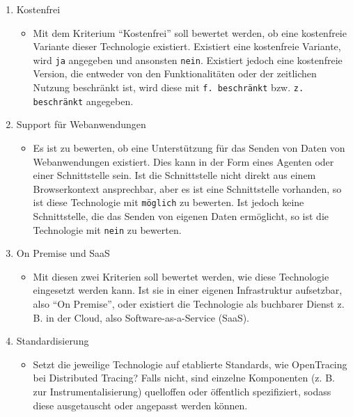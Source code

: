 \begin{enumerate}
	\item Kostenfrei
	\begin{itemize}
		\item Mit dem Kriterium \enquote{Kostenfrei} soll bewertet werden, ob eine kostenfreie Variante dieser Technologie existiert. Existiert eine kostenfreie Variante, wird \texttt{ja} angegeben und ansonsten \texttt{nein}. Existiert jedoch eine kostenfreie Version, die entweder von den Funktionalitäten oder der zeitlichen Nutzung beschränkt ist, wird diese mit \texttt{f. beschränkt} bzw. \texttt{z. beschränkt} angegeben.
	\end{itemize}

	\item Support für Webanwendungen
	\begin{itemize}
		\item Es ist zu bewerten, ob eine Unterstützung für das Senden von Daten von Webanwendungen existiert. Dies kann in der Form eines Agenten\footnotemark{} oder einer Schnittstelle sein. Ist die Schnittstelle nicht direkt aus einem Browserkontext ansprechbar, aber es ist eine Schnittstelle vorhanden, so ist diese Technologie mit \texttt{möglich} zu bewerten. Ist jedoch keine Schnittstelle, die das Senden von eigenen Daten ermöglicht, so ist die Technologie mit \texttt{nein} zu bewerten.
	\end{itemize}

	\item On Premise und SaaS
	\begin{itemize}
		\item Mit diesen zwei Kriterien soll bewertet werden, wie diese Technologie eingesetzt werden kann. Ist sie in einer eigenen Infrastruktur aufsetzbar, also \enquote{On Premise}, oder existiert die Technologie als buchbarer Dienst z. B. in der Cloud, also Software-as-a-Service (SaaS).
	\end{itemize}

	\item Standardisierung
	\begin{itemize}
		\item Setzt die jeweilige Technologie auf etablierte Standards, wie OpenTracing bei Distributed Tracing? Falls nicht, sind einzelne Komponenten (z. B. zur Instrumentalisierung) quelloffen oder öffentlich spezifiziert, sodass diese ausgetauscht oder angepasst werden können.
	\end{itemize}


\end{enumerate}
